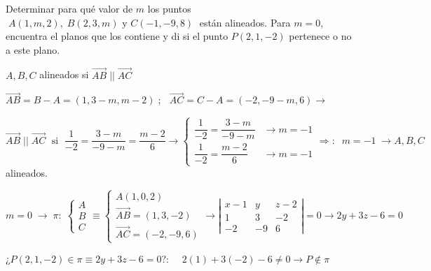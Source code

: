 \begin{ejre}
	Determinar para qué valor de $m$ los puntos $\;A(1,m,2),\; B(2,3,m) \text{ y } C(-1,-9,8)\;$ están alineados. Para $m=0$, encuentra el planos que los contiene y di si el punto $P(2,1,-2)$ pertenece o no a este plano.
\end{ejre}

\begin{proofw}\renewcommand{\qedsymbol}{$\diamond$}
	$A,B,C$ alineados si $\overrightarrow{AB}\;||\;\overrightarrow{AC}$
	
\noindent $\overrightarrow{AB}=B-A=(1,3-m,m-2)\; $; $\;\; \overrightarrow{AC}=C-A=(-2, -9-m,6) \to$

\noindent $ \overrightarrow{AB}\;||\;\overrightarrow{AC}\; \text{ si } \; \dfrac{1}{-2}=\dfrac{3-m}{-9-m}=\dfrac{m-2}{6} \to \begin{cases} \dfrac{1}{-2}=\dfrac{3-m}{-9-m} &\to m=-1 \\ \dfrac{1}{-2}=\dfrac{m-2}{6} &  \to m=-1 \end{cases} \Rightarrow:\; \;  m=-1 \; \longrightarrow A,B,C $ alineados.

\noindent $m=0 \;\to\;\pi:\;\begin{cases} A\\B\\C   \end{cases} \equiv \begin{cases}  A(1,0,2) \\ \overrightarrow{AB}=(1,3,-2) \\ \overrightarrow{AC}=(-2,-9,6) \end{cases}\to \left| \begin{matrix} x-1&y&z-2\\1&3&-2\\-2&-9&6 \end{matrix} \right|=0 \to 2y+3z-6=0$

\noindent ¿$P(2,1,-2) \in \pi \equiv 2y+3z-6=0 $?:  $\quad 2(1)+3(-2)-6\neq 0 \to P\notin \pi$
\end{proofw}


